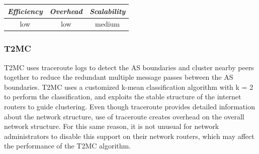 %
%

\begin{center}
\begin{tabular}{ccc}
\emph{Efficiency} & \emph{Overhead} & \emph{Scalability} \\
\hline
low &
%
low &
%
medium
\end{tabular}
\end{center}

\subsubsection{T2MC}

T2MC \cite{SLCGZ2008} uses traceroute logs to detect the AS boundaries and
cluster nearby peers together to reduce the redundant multiple message
passes between the AS boundaries. T2MC uses a customized k-mean classification
algorithm with k = 2 to perform the classification, and exploits the stable
structure of the internet routers to guide clustering. Even though traceroute
provides detailed information about the network structure, use of traceroute
creates overhead on the overall network structure. For this same reason, it is
not unusual for network administrators to disable this support on their network
routers, which may affect the performance of the T2MC algorithm.


